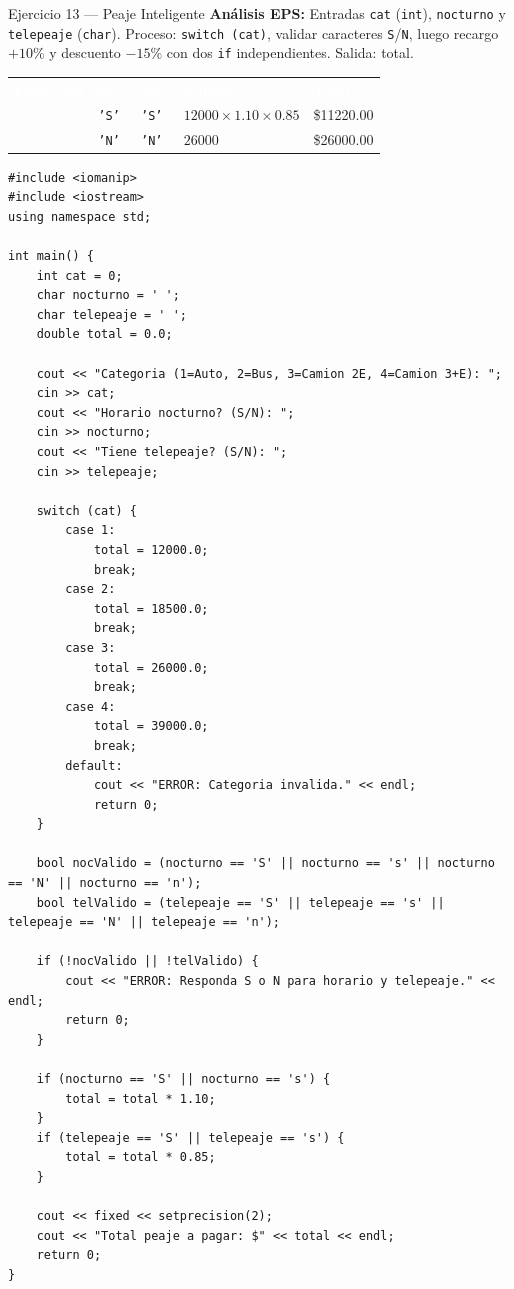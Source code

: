 \documentclass[11pt,letterpaper]{article}
\begin{document}
\begin{solucion}{Ejercicio 13 --- Peaje Inteligente}
\textbf{Análisis EPS:} Entradas \texttt{cat} (\texttt{int}), \texttt{nocturno} y \texttt{telepeaje} (\texttt{char}). Proceso: \texttt{switch (cat)}, validar caracteres \texttt{S}/\texttt{N}, luego recargo $+10\%$ y descuento $-15\%$ con dos \texttt{if} independientes. Salida: total.\\[4pt]
\footnotesize
\renewcommand{\arraystretch}{1.18}
\begin{tabularx}{\linewidth}{>{\centering\arraybackslash}p{1.2cm} >{\centering\arraybackslash}p{1.0cm} >{\centering\arraybackslash}p{1.2cm} >{\centering\arraybackslash}p{1.2cm} X >{\centering\arraybackslash}p{2.0cm}}
  \rowcolor{AzulMarino}
  \textcolor{white}{\textbf{Caso}} & \textcolor{white}{\texttt{cat}} & \textcolor{white}{\texttt{noc.}} & \textcolor{white}{\texttt{tel.}} & \textcolor{white}{\textbf{Cálculo}} & \textcolor{white}{\textbf{Total}} \\
  1 & 1 & \texttt{'S'} & \texttt{'S'} & $12000 \times 1.10 \times 0.85$ & \$11220.00 \\
  2 & 3 & \texttt{'N'} & \texttt{'N'} & $26000$ & \$26000.00 \\
  \bottomrule
\end{tabularx}
\end{solucion}

\begin{lstlisting}[style=cppmonitoria, caption={Solución E13 en C++}]
#include <iomanip>
#include <iostream>
using namespace std;

int main() {
    int cat = 0;
    char nocturno = ' ';
    char telepeaje = ' ';
    double total = 0.0;

    cout << "Categoria (1=Auto, 2=Bus, 3=Camion 2E, 4=Camion 3+E): ";
    cin >> cat;
    cout << "Horario nocturno? (S/N): ";
    cin >> nocturno;
    cout << "Tiene telepeaje? (S/N): ";
    cin >> telepeaje;

    switch (cat) {
        case 1:
            total = 12000.0;
            break;
        case 2:
            total = 18500.0;
            break;
        case 3:
            total = 26000.0;
            break;
        case 4:
            total = 39000.0;
            break;
        default:
            cout << "ERROR: Categoria invalida." << endl;
            return 0;
    }

    bool nocValido = (nocturno == 'S' || nocturno == 's' || nocturno == 'N' || nocturno == 'n');
    bool telValido = (telepeaje == 'S' || telepeaje == 's' || telepeaje == 'N' || telepeaje == 'n');

    if (!nocValido || !telValido) {
        cout << "ERROR: Responda S o N para horario y telepeaje." << endl;
        return 0;
    }

    if (nocturno == 'S' || nocturno == 's') {
        total = total * 1.10;
    }
    if (telepeaje == 'S' || telepeaje == 's') {
        total = total * 0.85;
    }

    cout << fixed << setprecision(2);
    cout << "Total peaje a pagar: $" << total << endl;
    return 0;
}
\end{lstlisting}
\end{document}
